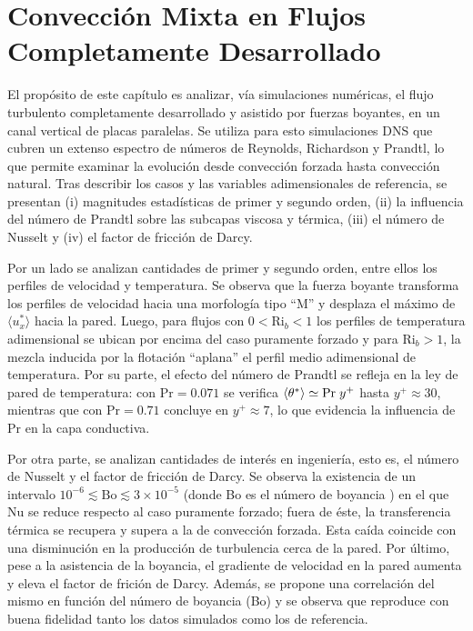 \chapter{Convección Mixta en Flujos Completamente Desarrollado} \label{cap:desarrollado}

El propósito de este capítulo es analizar, vía simulaciones numéricas, el flujo turbulento completamente desarrollado y asistido por fuerzas boyantes, en un canal vertical de placas paralelas. Se utiliza para esto simulaciones DNS que cubren un extenso espectro de números de Reynolds, Richardson y Prandtl, lo que permite examinar la evolución desde convección forzada hasta convección natural. Tras describir los casos y las variables adimensionales de referencia, se presentan (i) magnitudes estadísticas de primer y segundo orden, (ii) la influencia del número de Prandtl sobre las subcapas viscosa y térmica, (iii) el número de Nusselt y (iv) el factor de fricción de Darcy.

Por un lado se analizan cantidades de primer y segundo orden, entre ellos los perfiles de velocidad y temperatura. Se observa que la fuerza boyante transforma los perfiles de velocidad hacia una morfología tipo “M” y desplaza el máximo de $\langle u_x^* \rangle$ hacia la pared. Luego, para flujos con $0 < \text{Ri}_b < 1$ los perfiles de temperatura adimensional se ubican por encima del caso puramente forzado y para $\text{Ri}_b>1$, la mezcla inducida por la flotación “aplana” el perfil medio adimensional de temperatura. Por su parte, el efecto del número de Prandtl se refleja en la ley de pared de temperatura: con $\text{Pr}=0\text{.}071$ se verifica $\langle \theta^{*} \rangle \simeq \text{Pr} \hspace{1mm} y^+$ hasta $y^+ \approx 30$, mientras que con $\text{Pr}=0\text{.}71$ concluye en $y^+ \approx 7$, lo que evidencia la influencia de $\text{Pr}$ en la capa conductiva. 

Por otra parte, se analizan cantidades de interés en ingeniería, esto es, el número de Nusselt y el factor de fricción de Darcy.  Se observa la existencia de un intervalo $10^{-6} \lesssim \text{Bo} \lesssim 3\times10^{-5}$ (donde Bo es el número de boyancia \cite{jackson1989studies}) en el que $\text{Nu}$ se reduce respecto al caso puramente forzado; fuera de éste, la transferencia térmica se recupera y supera a la de convección forzada. Esta caída coincide con una disminución en la producción de turbulencia cerca de la pared. Por último, pese a la asistencia de la boyancia, el gradiente de velocidad en la pared aumenta y eleva el factor de frición de Darcy. Además, se propone una correlación del mismo en función del número de boyancia (Bo) y se observa que reproduce con buena fidelidad tanto los datos simulados como los de referencia.


